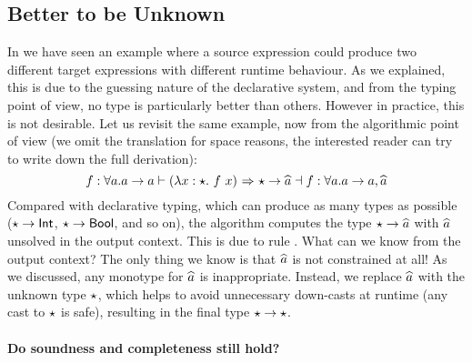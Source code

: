 \subsection{Better to be Unknown}
\label{subsec:algo:discuss}

In  we have seen an example where a source expression could
produce two different target expressions with different runtime behaviour. As we
explained, this is due to the guessing nature of the declarative system, and
from the typing point of view, no type is particularly better than others.
However in practice, this is not desirable. Let us revisit the same example, now
from the algorithmic point of view (we omit the translation for space reasons,
the interested reader can try to write down the full derivation):
\[
  f: \forall a. a \to a \vdash (\lambda x:\star.~ {f ~ x}) {~\Rightarrow~} \star \to \widehat{a} \dashv f : \forall a. a \to a, \widehat{a}
\]
Compared with declarative typing, which can produce as many types as
possible ($\star \to \mathsf{Int}$, $\star \to \mathsf{Bool}$, and so on), the algorithm
computes the type $\star \to \widehat{a}$ with $\widehat{a}$ unsolved in the output
context. This is due to rule . What can we know from the
output context? The only thing we know is that $\widehat{a}$ is not constrained at
all! As we discussed, any monotype for $\widehat{a}$ is inappropriate. Instead, we
replace $\widehat{a}$ with the unknown type $\star$, which helps to avoid unnecessary
down-casts at runtime (any cast to $\star$ is safe), resulting in the final
type $\star \to \star$.


\paragraph{Do soundness and completeness still hold?}

